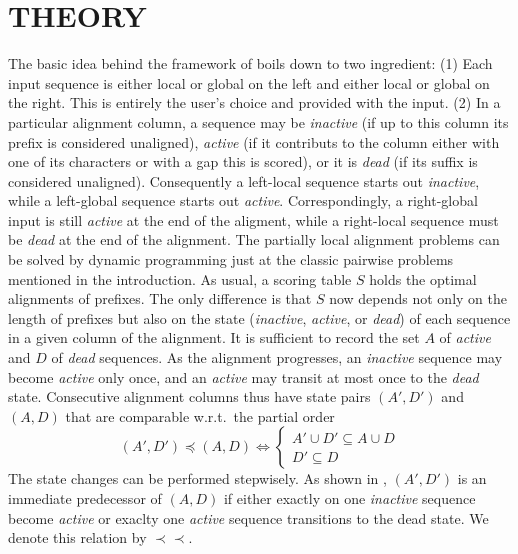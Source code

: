 \documentclass[a4paper,10pt]{article}
\newcommand{\pprec}{\mathrel{\prec\!\!\!\prec}}
\begin{document}
\section{\uppercase{Theory}}

The basic idea behind the framework of \citet{Retzlaff:18a} boils down to
two ingredient: (1) Each input sequence is either local or global on the
left and either local or global on the right. This is entirely the user's
choice and provided with the input. (2) In a particular alignment column, a
sequence may be \textit{inactive} (if up to this column its prefix is
considered unaligned), \textit{active} (if it contributs to the column
either with one of its characters or with a gap this is scored), or it is
\textit{dead} (if its suffix is considered unaligned). Consequently a
left-local sequence starts out \textit{inactive}, while a left-global
sequence starts out \textit{active}. Correspondingly, a right-global input
is still \textit{active} at the end of the aligment, while a right-local
sequence must be \textit{dead} at the end of the alignment. The partially
local alignment problems can be solved by dynamic programming just at the
classic pairwise problems mentioned in the introduction. As usual, a
scoring table $S$ holds the optimal alignments of prefixes. The only
difference is that $S$ now depends not only on the length of prefixes but
also on the state (\textit{inactive}, \textit{active}, or \textit{dead}) of
each sequence in a given column of the alignment. It is sufficient to
record the set $A$ of \textit{active} and $D$ of \textit{dead}
sequences. As the alignment progresses, an \textit{inactive} sequence may
become \textit{active} only once, and an \textit{active} may transit at
most once to the \textit{dead} state. Consecutive alignment columns thus
have state pairs $(A',D')$ and $(A,D)$ that are comparable w.r.t.\ the
partial order
\begin{equation}
  (A',D')\preceq(A,D) \iff
    \begin{cases} A'\cup D'\subseteq A\cup D \\
      D'\subseteq D
    \end{cases}
\end{equation}
The state changes can be performed stepwisely. As shown in
\cite{Retzlaff:18a}, $(A',D')$ is an immediate predecessor of $(A,D)$
if either exactly on one \textit{inactive} sequence become \textit{active}
or exaclty one  \textit{active} sequence transitions to the dead state.
We denote this relation by $\pprec$.
\end{document}
